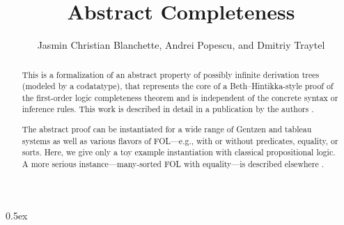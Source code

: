 \documentclass[11pt,a4paper]{article}
\begin{document}
\title{Abstract Completeness}
\author{Jasmin Christian Blanchette, Andrei Popescu, and Dmitriy Traytel}

\maketitle

\begin{abstract}
  This is a formalization of an abstract property of possibly infinite
  derivation trees (modeled by a codatatype), that represents the core of a
  Beth--Hintikka-style proof of the first-order logic completeness theorem and
  is independent of the concrete syntax or inference rules. This work is
  described in detail in a publication by the authors \cite{bla-compl}.

  The abstract proof can be instantiated for a wide range of Gentzen and tableau
  systems as well as various flavors of FOL---e.g., with or without predicates,
  equality, or sorts. Here, we give only a toy example instantiation with
  classical propositional logic. A more serious instance---many-sorted FOL with
  equality---is described elsewhere \cite{bla-mech}.
\end{abstract}




\tableofcontents

\parindent 0pt\parskip 0.5ex


\end{document}

